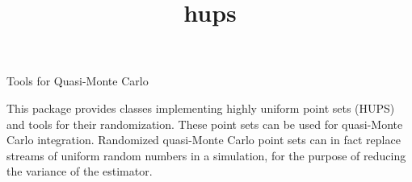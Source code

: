 \documentclass[12pt]{article}
\begin{document}
\begin{titlepage}

\title{hups}{Tools for Quasi-Monte Carlo}

This package provides classes implementing highly uniform point sets
(HUPS) and tools for their randomization.
These point sets can be used for quasi-Monte Carlo integration.
Randomized quasi-Monte Carlo point sets can in fact replace streams
of uniform random numbers in a simulation, for the purpose of
reducing the variance of the estimator.

\vfill
\end{titlepage}


\tableofcontents
{}














% 







































\end{document}
